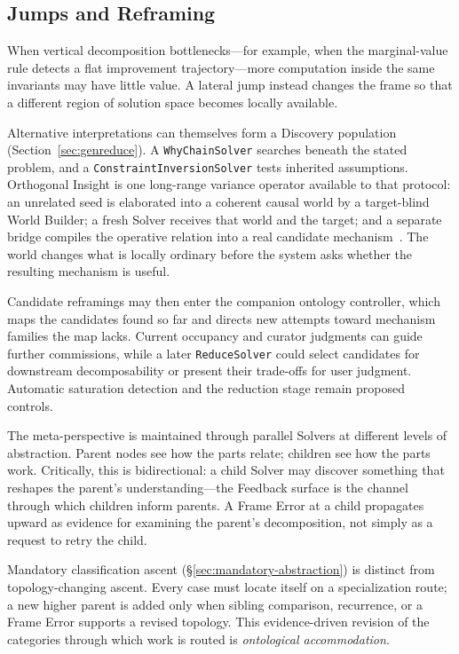 \documentclass[11pt]{article}
\let\oldtexttt\texttt
\renewcommand{\texttt}[1]{\oldtexttt{\small #1}}
\begin{document}
\subsection{Jumps and Reframing}
\label{sec:jumps}

When vertical decomposition bottlenecks---for example, when the marginal-value rule detects a flat improvement trajectory---more computation inside the same invariants may have little value. A lateral jump instead changes the frame so that a different region of solution space becomes locally available.

Alternative interpretations can themselves form a Discovery population (Section~\ref{sec:genreduce}). A \texttt{WhyChainSolver} searches beneath the stated problem, and a \texttt{ConstraintInversionSolver} tests inherited assumptions. Orthogonal Insight is one long-range variance operator available to that protocol: an unrelated seed is elaborated into a coherent causal world by a target-blind World Builder; a fresh Solver receives that world and the target; and a separate bridge compiles the operative relation into a real candidate mechanism~\cite{westerberg2025strangeworlds}. The world changes what is locally ordinary before the system asks whether the resulting mechanism is useful.

Candidate reframings may then enter the companion ontology controller, which maps the candidates found so far and directs new attempts toward mechanism families the map lacks. Current occupancy and curator judgments can guide further commissions, while a later \texttt{ReduceSolver} could select candidates for downstream decomposability or present their trade-offs for user judgment. Automatic saturation detection and the reduction stage remain proposed controls.

The meta-perspective is maintained through parallel Solvers at different levels of abstraction. Parent nodes see how the parts relate; children see how the parts work. Critically, this is bidirectional: a child Solver may discover something that reshapes the parent's understanding---the Feedback surface is the channel through which children inform parents. A Frame Error at a child propagates upward as evidence for examining the parent's decomposition, not simply as a request to retry the child.

Mandatory classification ascent (\S\ref{sec:mandatory-abstraction}) is distinct from topology-changing ascent. Every case must locate itself on a specialization route; a new higher parent is added only when sibling comparison, recurrence, or a Frame Error supports a revised topology. This evidence-driven revision of the categories through which work is routed is \emph{ontological accommodation}.
\end{document}
